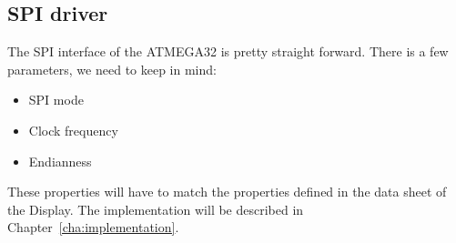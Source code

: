 \subsection{SPI driver}

The SPI interface of the ATMEGA32 is pretty straight forward. There is a few parameters, we need to keep in mind:

\begin{itemize}
\item SPI mode
\item Clock frequency
\item Endianness
\end{itemize}

These properties will have to match the properties defined in the data sheet of the Display. The implementation will be described in Chapter~\ref{cha:implementation}.
